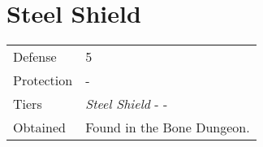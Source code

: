 \section{Steel Shield}
\label{armor:steel_shield}


\noindent\begin{tabularx}{\textwidth}[l]{lX}
	Defense
	& 5
\\ %
	Protection
	& -
\\ %
	Tiers
	& \textit{Steel Shield} - \nameref{armor:venus_shield} - \nameref{armor:aegis_shield}
\\ %
	Obtained
	& Found in the Bone Dungeon.
\end{tabularx}
